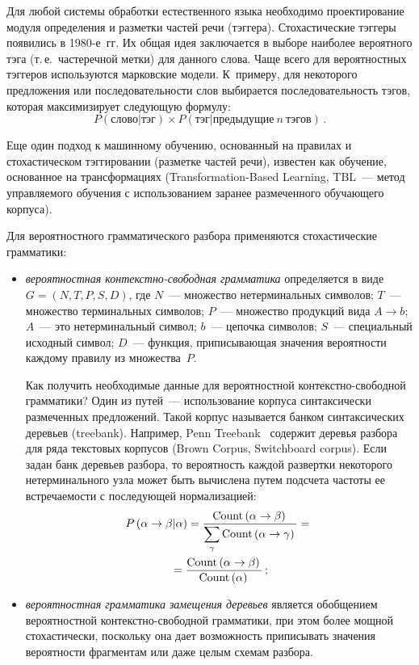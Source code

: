 \begin{multicols}{2}
     Для любой системы обработки естественного языка необходимо 
проектирование модуля определения и разметки частей речи (тэггера). 
Стохастические тэггеры появились в 1980-е~гг. Их общая идея 
заключается в выборе наиболее вероятного тэга (т.\,е.\ частеречной метки) 
для данного слова. Чаще всего для вероятностных тэггеров используются 
марковские модели. К~примеру, для некоторого предложения или 
последовательности слов выбирается последовательность тэгов, которая 
максимизирует следующую формулу:
     \begin{equation*}
     P(\mathrm{слово}\vert \mathrm{тэг})\times P(\mathrm{тэг}\vert 
\mathrm{предыдущие}\ n\ \mathrm{тэгов})\,.
     \end{equation*}
     
     Еще один подход к машинному обучению, основанный на правилах и 
стохастическом тэггировании (разметке частей речи), известен как обучение, 
основанное на трансформациях (Transformation-Based Learning, TBL~--- 
метод управляемого обуче\-ния с использованием заранее 
размеченного обуча\-юще\-го корпуса).
     
     Для вероятностного грамматического разбора применяются 
стохастические грамматики:
     \begin{itemize}
\item \textit{вероятностная контекстно-свободная грамматика} 
определяется в виде $G = (N, T, P, S, D)$, где $N$~--- множество 
нетерминальных символов; $T$~--- множество терминальных символов; 
$P$~--- множество продукций вида $A\rightarrow b$; $A$~--- это 
нетерминальный символ; $b$~--- цепочка символов; $S$~--- специальный 
исходный символ; $D$~--- функция, приписывающая значения ве\-ро\-ят\-ности 
каждому правилу из множества~$P$. 

Как получить необходимые данные для 
вероятностной контекстно-свободной грамматики? Один из путей~--- 
использование корпуса синтаксически размеченных предложений. Такой 
корпус называется банком синтаксических деревьев (treebank). Например, 
Penn Treebank~\cite{25koz} содержит деревья разбора для ряда текстовых 
корпусов (Brown Corpus, Switchboard corpus). Если задан банк деревьев 
разбора, то вероятность каждой развертки некоторого нетерминального узла 
может быть вычислена путем подсчета частоты ее встречаемости с 
по\-сле\-ду\-ющей нормализацией:
\begin{multline*}
P\left(\alpha\rightarrow\beta\vert\alpha\right) 
=\displaystyle\frac{\displaystyle \mathrm{Count}\left(\alpha\rightarrow\beta\right)\mathstrut}{\displaystyle \sum\limits_{\gamma} 
\mathrm{Count}\left(\alpha\rightarrow\gamma\right)\mathstrut}={}\\
{}=\displaystyle\frac{\displaystyle  \mathrm{Count}\left(\alpha\rightarrow\beta\right)\mathstrut}{\displaystyle \mathrm{Count}\left(\alpha\right)\mathstrut}\,;
\end{multline*}
\item \textit{вероятностная грамматика замещения деревьев} является 
обобщением вероятностной контекстно-свободной грамматики, при этом 
более мощной стохастически, поскольку она дает возможность приписывать 
значения ве\-ро\-ят\-ности фрагментам или даже целым схемам разбора.
\end{itemize}


\end{multicols}
